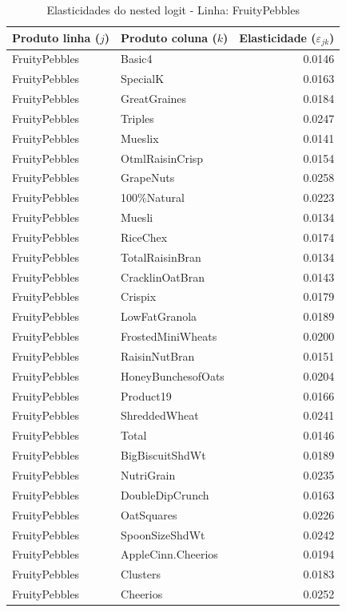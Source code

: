 \begingroup
\begin{table}[H]
\centering
\caption{Elasticidades do nested logit - Linha: FruityPebbles}
\label{tab:elas-nested-fruitypebbles}
\small
\begin{tabular}{llr}
\toprule
Produto linha ($j$) & Produto coluna ($k$) & Elasticidade ($\varepsilon_{jk}$) \\
\midrule
FruityPebbles & Basic4 & 0.0146 \\
FruityPebbles & SpecialK & 0.0163 \\
FruityPebbles & GreatGraines & 0.0184 \\
FruityPebbles & Triples & 0.0247 \\
FruityPebbles & Mueslix & 0.0141 \\
FruityPebbles & OtmlRaisinCrisp & 0.0154 \\
FruityPebbles & GrapeNuts & 0.0258 \\
FruityPebbles & 100\%Natural & 0.0223 \\
FruityPebbles & Muesli & 0.0134 \\
FruityPebbles & RiceChex & 0.0174 \\
FruityPebbles & TotalRaisinBran & 0.0134 \\
FruityPebbles & CracklinOatBran & 0.0143 \\
FruityPebbles & Crispix & 0.0179 \\
FruityPebbles & LowFatGranola & 0.0189 \\
FruityPebbles & FrostedMiniWheats & 0.0200 \\
FruityPebbles & RaisinNutBran & 0.0151 \\
FruityPebbles & HoneyBunchesofOats & 0.0204 \\
FruityPebbles & Product19 & 0.0166 \\
FruityPebbles & ShreddedWheat & 0.0241 \\
FruityPebbles & Total & 0.0146 \\
FruityPebbles & BigBiscuitShdWt & 0.0189 \\
FruityPebbles & NutriGrain & 0.0235 \\
FruityPebbles & DoubleDipCrunch & 0.0163 \\
FruityPebbles & OatSquares & 0.0226 \\
FruityPebbles & SpoonSizeShdWt & 0.0242 \\
FruityPebbles & AppleCinn.Cheerios & 0.0194 \\
FruityPebbles & Clusters & 0.0183 \\
FruityPebbles & Cheerios & 0.0252 \\

\end{tabular}
\end{table}
